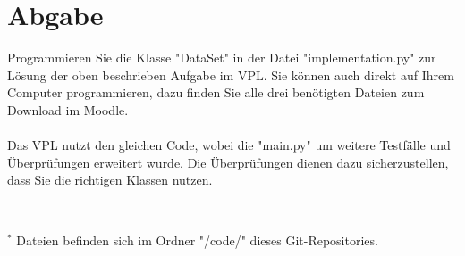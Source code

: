 \documentclass[]{article}
\begin{document}
\section{Abgabe}
Programmieren Sie die Klasse "DataSet" in der Datei "implementation.py" zur Lösung der oben beschrieben Aufgabe im VPL.
Sie können auch direkt auf Ihrem Computer programmieren, dazu finden Sie alle drei benötigten Dateien zum Download im Moodle.\\
\\
Das VPL nutzt den gleichen Code, wobei die "main.py" um weitere Testfälle und Überprüfungen erweitert wurde.
Die Überprüfungen dienen dazu sicherzustellen, dass Sie die richtigen Klassen nutzen.\\
%
\hrule\hfill\\[0.2cm]
$^*$ Dateien befinden sich im Ordner "/code/" dieses Git-Repositories.\\
\end{document}
